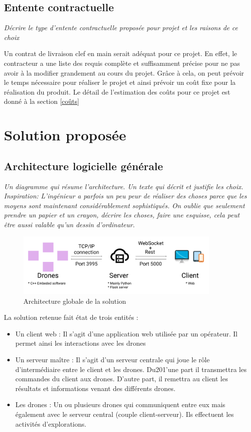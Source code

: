 \documentclass{mistcoursedoc}
\begin{document}
\subsection{Entente contractuelle}

\textit{Décrire le type d’entente contractuelle proposée pour projet et les raisons de ce choix}

Un contrat de livraison clef en main serait adéquat pour ce projet. En effet, le contracteur a une liste des requis complète et suffisamment précise pour ne pas avoir à la modifier grandement au cours du projet.
Grâce à cela, on peut prévoir le temps nécessaire pour réaliser le projet et ainsi prévoir un coût fixe pour la réalisation du produit. Le détail de l'estimation des coûts pour ce projet est donné à la section \ref{coûts}

\section{Solution proposée}

\subsection{Architecture logicielle générale}

\textit{Un diagramme qui résume l’architecture. Un texte qui décrit et justifie les choix. Inspiration: \og L’ingénieur a parfois un peu peur de réaliser des choses parce que les moyens sont maintenant considérablement sophistiqués. On oublie que seulement prendre un papier et un crayon, décrire les choses, faire une esquisse, cela peut être aussi valable qu’un dessin d’ordinateur.}

\begin{figure}[h!]
  \centering\includegraphics[width=0.9\textwidth]{architecture-globale.png}
  \caption{Architecture globale de la solution}
\end{figure}

\par La solution retenue fait état de trois entités :
\begin{itemize}
  \item Un client web : Il s'agit d’une application web utilisée par un opérateur. Il permet ainsi les interactions avec les drones
  \item Un serveur maître : Il s’agit d’un serveur centrale qui joue le rôle d'intermédiaire entre le client et les drones. Du201’une part il transmettra les commandes du client aux drones. D'autre part, il remettra au client les résultats et informations venant des différents drones.
  \item Les drones : Un ou plusieurs drones qui communiquent entre eux mais également avec le serveur central (couple client-serveur). Ils effectuent les activités d'explorations.
\end{itemize}
\end{document}
